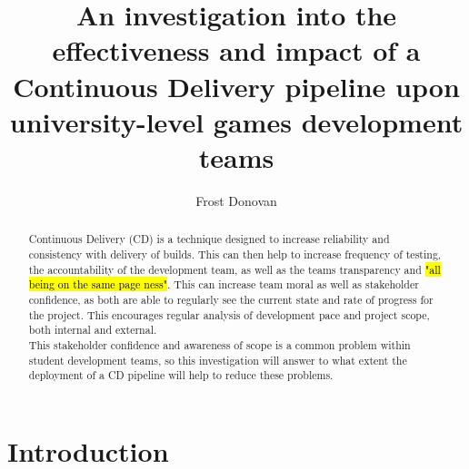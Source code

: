 \documentclass[lettersize,journal]{IEEEtran}
\begin{document}
\title{An investigation into the effectiveness and impact of a Continuous Delivery pipeline upon university-level games development teams}

\author{Frost Donovan}

\maketitle

\begin{abstract}

    Continuous Delivery (CD) is a technique designed to increase reliability and consistency with delivery of builds. This can then help to increase frequency of testing, the accountability of the development team, as well as the teams transparency and \hl{"all being on the same page ness"}. This can increase team moral as well as stakeholder confidence, as both are able to regularly see the current state and rate of progress for the project. This encourages regular analysis of development pace and project scope, both internal and external. \\
    This stakeholder confidence and awareness of scope is a common problem within student development teams, so this investigation will answer to what extent the deployment of a CD pipeline will help to reduce these problems.
\end{abstract}

\section{Introduction}
\end{document}
